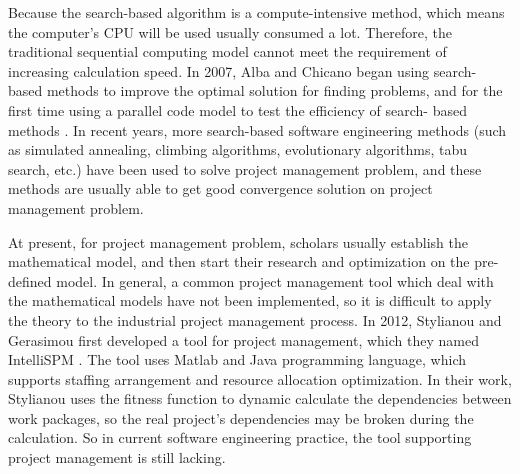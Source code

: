 Because the search-based algorithm is a compute-intensive method, which means 
the computer's CPU will be used usually consumed a lot. Therefore, the 
traditional sequential computing model cannot meet the requirement of 
increasing calculation speed. In 2007, Alba and Chicano began using search-
based methods to improve the optimal solution for finding problems, and for 
the first time using a parallel code model to test the efficiency of search-
based methods \cite{pospichal}. In recent years, more search-based software 
engineering methods (such as simulated annealing, climbing algorithms, 
evolutionary algorithms, tabu search, etc.) have been used to solve project 
management problem, and these methods are usually able to get good 
convergence solution on project management problem.


At present, for project management problem, scholars usually establish the
mathematical model, and then start their research and optimization on the
pre-defined model. In general, a common project management tool which deal with
the mathematical models have not been implemented, so it is difficult to apply
the theory to the industrial project management process. In 2012, Stylianou and
Gerasimou first developed a tool for project management, which they named
IntelliSPM \cite{stylianou}. The tool uses Matlab and Java programming language,
which supports staffing arrangement and resource allocation optimization. In
their work, Stylianou uses the fitness function to dynamic calculate the
dependencies between work packages, so the real project's dependencies may be
broken during the calculation. So in current software engineering practice, the
tool supporting project management is still lacking.




